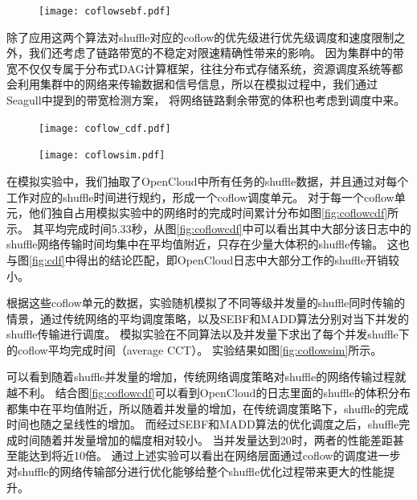 \begin{figure}[!htp]
	\centering
	\texttt{[image: coflowsebf.pdf]}
\end{figure}

除了应用这两个算法对shuffle对应的coflow的优先级进行优先级调度和速度限制之外，我们还考虑了链路带宽的不稳定对限速精确性带来的影响。
因为集群中的带宽不仅仅专属于分布式DAG计算框架，往往分布式存储系统，资源调度系统等都会利用集群中的网络来传输数据和信号信息，所以在模拟过程中，我们通过Seagull\cite{seagull}中提到的带宽检测方案，
将网络链路剩余带宽的体积也考虑到调度中来。

\begin{figure}[!htp]
	\centering
	\texttt{[image: coflow\_cdf.pdf]}
\end{figure}

\begin{figure}[!htp]
	\centering
	\texttt{[image: coflowsim.pdf]}
\end{figure}

在模拟实验中，我们抽取了OpenCloud中所有任务的shuffle数据，并且通过对每个工作对应的shuffle时间进行规约，形成一个coflow调度单元。
对于每一个coflow单元，他们独自占用模拟实验中的网络时的完成时间累计分布如图\ref{fig:coflowcdf}所示。
其平均完成时间5.33秒，从图\ref{fig:coflowcdf}中可以看出其中大部分该日志中的shuffle网络传输时间均集中在平均值附近，只存在少量大体积的shuffle传输。
这也与图\ref{fig:cdf}中得出的结论匹配，即OpenCloud日志中大部分工作的shuffle开销较小。

根据这些coflow单元的数据，实验随机模拟了不同等级并发量的shuffle同时传输的情景，通过传统网络的平均调度策略，以及SEBF和MADD算法分别对当下并发的shuffle传输进行调度。
模拟实验在不同算法以及并发量下求出了每个并发shuffle下的coflow平均完成时间（average CCT）。
实验结果如图\ref{fig:coflowsim}所示。

可以看到随着shuffle并发量的增加，传统网络调度策略对shuffle的网络传输过程就越不利。
结合图\ref{fig:coflowcdf}可以看到OpenCloud的日志里面的shuffle的体积分布都集中在平均值附近，所以随着并发量的增加，在传统调度策略下，shuffle的完成时间也随之呈线性的增加。
而经过SEBF和MADD算法的优化调度之后，shuffle完成时间随着并发量增加的幅度相对较小。
当并发量达到20时，两者的性能差距甚至能达到将近10倍。
通过上述实验可以看出在网络层面通过coflow的调度进一步对shuffle的网络传输部分进行优化能够给整个shuffle优化过程带来更大的性能提升。

